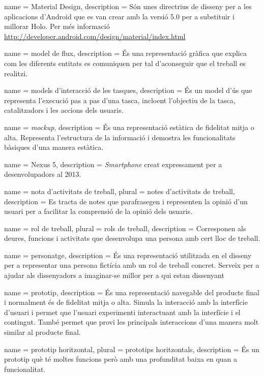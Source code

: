 {
name = Material Design, description = {Són unes directrius de disseny per a les aplicacions d'Android que es van crear amb la versió 5.0 per a substituir i millorar Holo. Per més informació \url{http://developer.android.com/design/material/index.html}}
}

{
name = model de flux, description = {És una representació gràfica que explica com les diferents entitats es comuniquen per tal d'aconseguir que el treball es realitzi.}
}

{
name = models d'interacció de les tasques, description = {És un model d'ús que representa l'execució pas a pas d'una tasca, incloent l'objectiu de la tasca, catalitzadors i les accions dels usuaris.}
}

{
name = \textit{mockup}, description = {És una representació estàtica de fidelitat mitja o alta.  Representa l'estructura de la informació i demostra les funcionalitats bàsiques d'una manera estàtica.}
}

{
name = Nexus 5, description = {\textit{Smartphone} creat expressament per a desenvolupadors al 2013.}  
}

{
name = nota d'activitats de treball, plural = notes d'activitats de treball, description = {Es tracta de notes que parafrasegen i representen la opinió d'un usuari per a facilitar la comprensió de la opinió dels usuaris.}  
}

{
name = rol de treball, plural = rols de treball, description = {Corresponen als deures, funcions i activitats que desenvolupa una persona amb cert lloc de treball.}  
}

{
name = personatge, description = {És una representació utilitzada en el disseny per a representar una persona fictícia amb un rol de treball concret. Serveix per a ajudar als dissenyadors a imaginar-se millor per a qui estan dissenyant}  
}

{
name = prototip, description = {És una representació navegable del producte final i normalment és de fidelitat mitja o alta. Simula la interacció amb la interfície d'usuari i permet que l'usuari experimenti interactuant amb la interfície i el contingut. També permet que provi les principals interaccions d'una manera molt similar al producte final.}
}

{
name = prototip horitzontal, plural = prototips horitzontals, description = {És un prototip què té moltes funcions però amb una profunditat baixa en quan a funcionalitat.}
}

